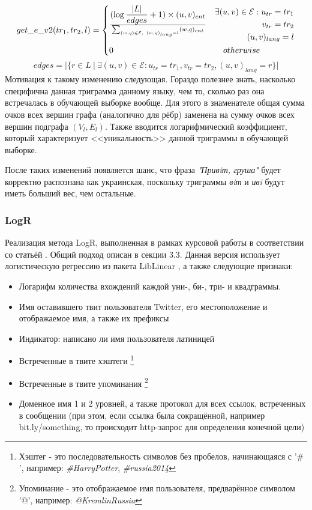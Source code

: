 \documentclass[a4paper, 14pt]{article}
\begin{document}
			\[
 			get\_e\_v2(tr_1, tr_2, l) =
 			  \begin{dcases}
  			   {(\log{|L| \over edges} + 1) \times (u, v)_{cnt}} 
  			   \over \sum_{(w, q) \in \mathcal{E},\ (w, q)_{lang}=l} (w, q)_{cnt} & 
  			    \begin{split} 
						 \exists (u, v) \in \mathcal{E}:  u_{tr}=tr_1 \\ v_{tr}=tr_2 \\ (u, v)_{lang}=l
  			   	\end{split} \\
  			   0 & \quad otherwise
  			 \end{dcases}
			\]	
			$$ edges = |\{r \in L \ | \ \exists (u, v) \in \mathcal{E}: u_{tr}=tr_1, v_{tr}=tr_2, (u, v)_{lang}=r\}| $$
			Мотивация к такому изменению следующая. Гораздо полезнее знать, насколько специфична данная триграмма данному языку, чем то, сколько раз
			 она встречалась в обучающей выборке вообще. Для этого в знаменателе общая сумма очков всех вершин графа (аналогично для рёбр) заменена 
			на сумму очков всех вершин подграфа $(V_{l}, E_{l})$. Также вводится логарифмический коэффициент, который характеризует <<уникальность>> данной триграммы в обучающей выборке.
			
			После таких изменений появляется шанс, что фраза \textit{"Привiт, груша"} будет корректно распознана как украинская, поскольку триграммы
			\textit{вiт} и \textit{ивi} будут иметь больший вес, чем остальные.
			\subsubsection{LogR}
			Реализация метода LogR, выполненная в рамках курсовой работы в соответствии со статьёй \cite{ppm}. Общий подход описан в секции 3.3. Данная версия использует логистическую регрессию из пакета LibLinear \cite{fan}, а также следующие признаки:
			\begin{itemize}
				\item Логарифм количества вхождений каждой уни-, би-, три- и квадграммы.
				\item Имя оставившего твит пользователя Twitter, его местоположение и отображаемое имя, а также их префиксы
				\item Индикатор: написано ли имя пользователя латиницей
				\item Встреченные в твите хэштеги
					\footnote{Хэштег - это последовательность символов без пробелов, начинающаяся с '$\#$', например: \textit{\#HarryPotter}, \textit{\#russia2014}}
				\item Встреченные в твите упоминания
					\footnote{Упоминание - это отображаемое имя пользователя, предварённое символом '@', например: \textit{@KremlinRussia}}
				\item Доменное имя 1 и 2 уровней, а также протокол для всех ссылок, встреченных в сообщении (при этом, если ссылка была сокращённой,
				например bit.ly/something, то происходит http-запрос для определения конечной цели)
			\end{itemize}
\end{document}
